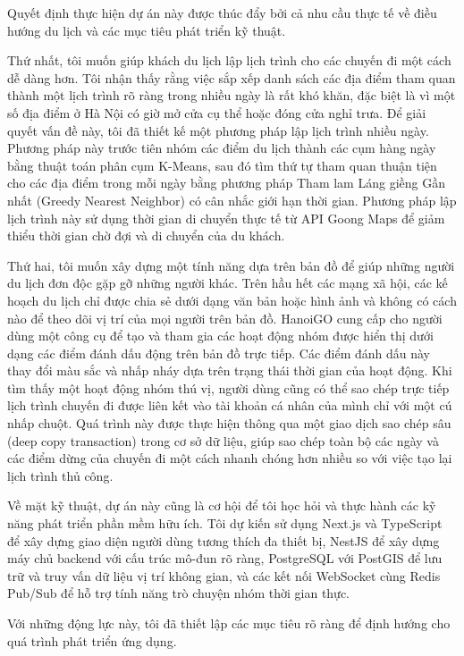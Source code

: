 \documentclass[a4paper,12pt]{report}
\begin{document}
Quyết định thực hiện dự án này được thúc đẩy bởi cả nhu cầu thực tế về điều hướng du lịch và các mục tiêu phát triển kỹ thuật.

Thứ nhất, tôi muốn giúp khách du lịch lập lịch trình cho các chuyến đi một cách dễ dàng hơn. Tôi nhận thấy rằng việc sắp xếp danh sách các địa điểm tham quan thành một lịch trình rõ ràng trong nhiều ngày là rất khó khăn, đặc biệt là vì một số địa điểm ở Hà Nội có giờ mở cửa cụ thể hoặc đóng cửa nghỉ trưa. Để giải quyết vấn đề này, tôi đã thiết kế một phương pháp lập lịch trình nhiều ngày. Phương pháp này trước tiên nhóm các điểm du lịch thành các cụm hàng ngày bằng thuật toán phân cụm K-Means, sau đó tìm thứ tự tham quan thuận tiện cho các địa điểm trong mỗi ngày bằng phương pháp Tham lam Láng giềng Gần nhất (Greedy Nearest Neighbor) có cân nhắc giới hạn thời gian. Phương pháp lập lịch trình này sử dụng thời gian di chuyển thực tế từ API Goong Maps để giảm thiểu thời gian chờ đợi và di chuyển của du khách.

Thứ hai, tôi muốn xây dựng một tính năng dựa trên bản đồ để giúp những người du lịch đơn độc gặp gỡ những người khác. Trên hầu hết các mạng xã hội, các kế hoạch du lịch chỉ được chia sẻ dưới dạng văn bản hoặc hình ảnh và không có cách nào để theo dõi vị trí của mọi người trên bản đồ. HanoiGO cung cấp cho người dùng một công cụ để tạo và tham gia các hoạt động nhóm được hiển thị dưới dạng các điểm đánh dấu động trên bản đồ trực tiếp. Các điểm đánh dấu này thay đổi màu sắc và nhấp nháy dựa trên trạng thái thời gian của hoạt động. Khi tìm thấy một hoạt động nhóm thú vị, người dùng cũng có thể sao chép trực tiếp lịch trình chuyến đi được liên kết vào tài khoản cá nhân của mình chỉ với một cú nhấp chuột. Quá trình này được thực hiện thông qua một giao dịch sao chép sâu (deep copy transaction) trong cơ sở dữ liệu, giúp sao chép toàn bộ các ngày và các điểm dừng của chuyến đi một cách nhanh chóng hơn nhiều so với việc tạo lại lịch trình thủ công.

Về mặt kỹ thuật, dự án này cũng là cơ hội để tôi học hỏi và thực hành các kỹ năng phát triển phần mềm hữu ích. Tôi dự kiến sử dụng Next.js và TypeScript để xây dựng giao diện người dùng tương thích đa thiết bị, NestJS để xây dựng máy chủ backend với cấu trúc mô-đun rõ ràng, PostgreSQL với PostGIS để lưu trữ và truy vấn dữ liệu vị trí không gian, và các kết nối WebSocket cùng Redis Pub/Sub để hỗ trợ tính năng trò chuyện nhóm thời gian thực.

Với những động lực này, tôi đã thiết lập các mục tiêu rõ ràng để định hướng cho quá trình phát triển ứng dụng.
\end{document}
